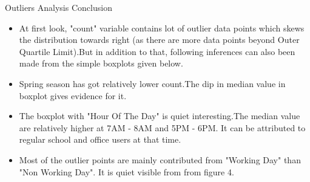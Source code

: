 \documentclass[
 size=14pt,
 paper=smartboard,  %
 mode=present, 		%
 display=slides, 	%
 style=tuliplab,  	%
 pauseslide,
 fleqn,leqno]{powerdot}
\begin{document}
\begin{slide}{Outliers Analysis Conclusion}
\begin{itemize}
\item
At first look, "count" variable contains lot of outlier data points which skews the distribution towards right (as there are more data points beyond Outer Quartile Limit).But in addition to that, following inferences can also been made from the simple boxplots given below.
\item
Spring season has got relatively lower count.The dip in median value in boxplot gives evidence for it.
\item
The boxplot with "Hour Of The Day" is quiet interesting.The median value are relatively higher at 7AM - 8AM and 5PM - 6PM. It can be attributed to regular school and office users at that time.
\item
Most of the outlier points are mainly contributed from "Working Day" than "Non Working Day". It is quiet visible from from figure 4.
\end{itemize}
\end{slide}

\end{document}
